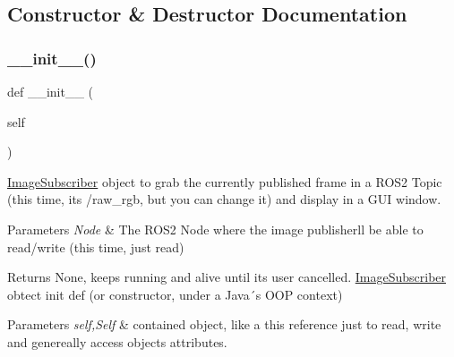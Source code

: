 \subsection{Constructor \& Destructor Documentation}
\mbox{\label{classtoxic__vision_1_1webcam__sub_1_1ImageSubscriber_ae64f0875afe3067b97ba370b354b9213}} 
\subsubsection{\texorpdfstring{\+\_\+\+\_\+init\+\_\+\+\_\+()}{\_\_init\_\_()}}
{\footnotesize\ttfamily def \+\_\+\+\_\+init\+\_\+\+\_\+ (\begin{DoxyParamCaption}\item[{}]{self }\end{DoxyParamCaption})}



\mbox{\hyperlink{classtoxic__vision_1_1webcam__sub_1_1ImageSubscriber}{Image\+Subscriber}} object to grab the currently published frame in a R\+O\+S2 Topic (this time, it\textquotesingle{}s \textquotesingle{}/raw\+\_\+rgb\textquotesingle{}, but you can change it) and display in a G\+UI window. 


\begin{DoxyParams}{Parameters}
{\em Node} & The R\+O\+S2 Node where the image publisher\textquotesingle{}ll be able to read/write (this time, just read)\\
\hline
\end{DoxyParams}
\begin{DoxyReturn}{Returns}
None, keeps running and alive until it\textquotesingle{}s user cancelled. \mbox{\hyperlink{classtoxic__vision_1_1webcam__sub_1_1ImageSubscriber}{Image\+Subscriber}} obtect init def (or constructor, under a Java´s O\+OP context)
\end{DoxyReturn}

\begin{DoxyParams}{Parameters}
{\em self,Self} & contained object, like a \textquotesingle{}this\textquotesingle{} reference just to read, write and genereally access object\textquotesingle{}s attributes. \\
\hline
\end{DoxyParams}

